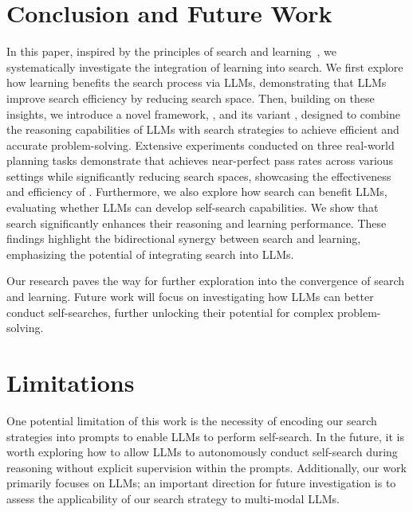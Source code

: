 \section{Conclusion and Future Work}
In this paper, inspired by the principles of search and learning~\cite{Sutton2019BitterLesson,snell2024scaling}, we systematically investigate the integration of learning into search. We first explore how learning benefits the search process via LLMs, demonstrating that LLMs improve search efficiency by reducing search space.
Then, building on these insights, we introduce a novel framework, \method, and its variant \cmethod, designed to combine the reasoning capabilities of LLMs with search strategies to achieve efficient and accurate problem-solving. 
Extensive experiments conducted on three real-world planning tasks demonstrate that \method achieves near-perfect pass rates across various settings while significantly reducing search spaces, showcasing the effectiveness and efficiency of \method. Furthermore, we also explore how search can benefit LLMs, evaluating whether LLMs can develop self-search capabilities. 
We show that search significantly enhances their reasoning and learning performance. These findings highlight the bidirectional synergy between search and learning, emphasizing the potential of integrating search into LLMs.

Our research 
paves the way for further exploration into the convergence of search and learning. Future work will focus on investigating how LLMs can better conduct self-searches, further unlocking their potential for complex problem-solving.

\section{Limitations}
One potential limitation of this work is the necessity of encoding our search strategies into prompts to enable LLMs to perform self-search. In the future, it is worth exploring how to allow LLMs to autonomously conduct self-search during reasoning without explicit supervision within the prompts. Additionally, our work primarily focuses on LLMs; an important direction for future investigation is to assess the applicability of our search strategy to multi-modal LLMs.

